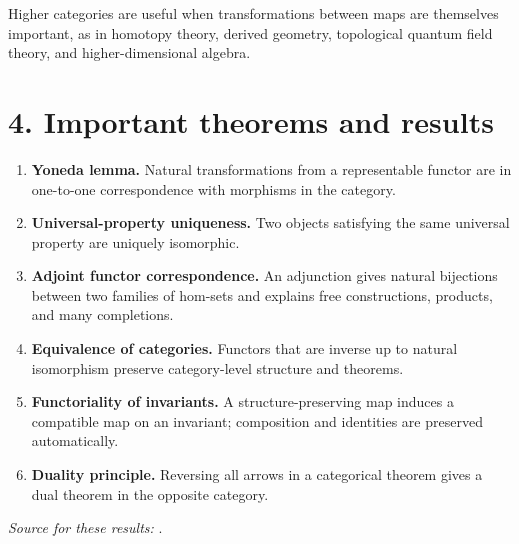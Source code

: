 Higher categories are useful when transformations between maps are themselves important, as in homotopy theory, derived geometry, topological quantum field theory, and higher-dimensional algebra.

\section*{4. Important theorems and results}
\begin{enumerate}[leftmargin=*,itemsep=0.35em]

\item \textbf{Yoneda lemma.} Natural transformations from a representable functor are in one-to-one correspondence with morphisms in the category.

\item \textbf{Universal-property uniqueness.} Two objects satisfying the same universal property are uniquely isomorphic.

\item \textbf{Adjoint functor correspondence.} An adjunction gives natural bijections between two families of hom-sets and explains free constructions, products, and many completions.

\item \textbf{Equivalence of categories.} Functors that are inverse up to natural isomorphism preserve category-level structure and theorems.

\item \textbf{Functoriality of invariants.} A structure-preserving map induces a compatible map on an invariant; composition and identities are preserved automatically.

\item \textbf{Duality principle.} Reversing all arrows in a categorical theorem gives a dual theorem in the opposite category.
\end{enumerate}
\noindent\emph{Source for these results:} \cite{category_theory_ref1}.

